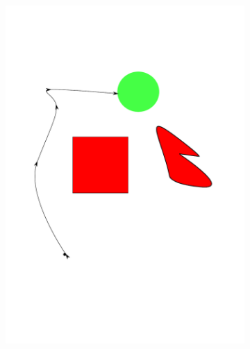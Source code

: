 \documentclass[../thesis.tex]{subfiles}
\begin{document}
\begin{figure}
\begin{subfigure}[b]{0.24\linewidth}
  \end{subfigure}
  \hfill
  \begin{subfigure}[b]{0.24\linewidth}
    \includegraphics[width=\linewidth]{./Planning/trajectory_2.pdf}    
  \end{subfigure}
  \begin{subfigure}[b]{0.24\linewidth}

\end{subfigure}
\end{figure}
\end{document}
